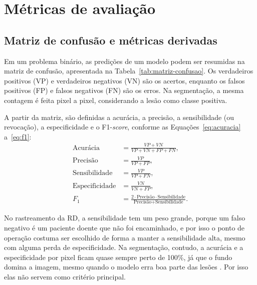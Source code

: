 \section{Métricas de avaliação}
\label{sec:metricas}

\subsection{Matriz de confusão e métricas derivadas}
\label{sec:matriz-confusao}

Em um problema binário, as predições de um modelo podem ser resumidas na matriz de confusão, apresentada na Tabela~\ref{tab:matriz-confusao}. Os verdadeiros positivos (VP) e verdadeiros negativos (VN) são os acertos, enquanto os falsos positivos (FP) e falsos negativos (FN) são os erros. Na segmentação, a mesma contagem é feita pixel a pixel, considerando a lesão como classe positiva.

\begin{table}[H]
	\caption{\label{tab:matriz-confusao} Matriz de confusão para um problema binário}%
\end{table}

A partir da matriz, são definidas a acurácia, a precisão, a sensibilidade (ou revocação), a especificidade e o F1-\textit{score}, conforme as Equações~\ref{eq:acuracia} a~\ref{eq:f1}:
\begin{align}
	\text{Acurácia} &= \frac{VP + VN}{VP + VN + FP + FN}, \label{eq:acuracia}\\
	\text{Precisão} &= \frac{VP}{VP + FP}, \\
	\text{Sensibilidade} &= \frac{VP}{VP + FN}, \\
	\text{Especificidade} &= \frac{VN}{VN + FP}, \\
	F_1 &= \frac{2 \cdot \text{Precisão} \cdot \text{Sensibilidade}}{\text{Precisão} + \text{Sensibilidade}}. \label{eq:f1}
\end{align}

No rastreamento da RD, a sensibilidade tem um peso grande, porque um falso negativo é um paciente doente que não foi encaminhado, e por isso o ponto de operação costuma ser escolhido de forma a manter a sensibilidade alta, mesmo com alguma perda de especificidade. Na segmentação, contudo, a acurácia e a especificidade por pixel ficam quase sempre perto de 100\%, já que o fundo domina a imagem, mesmo quando o modelo erra boa parte das lesões \cite{reinke2024pitfalls}. Por isso elas não servem como critério principal.

